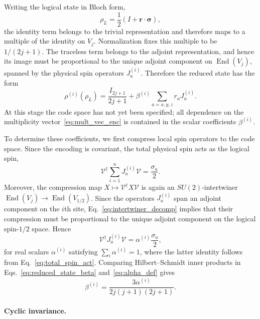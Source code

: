 \documentclass[10pt,twocolumn,superscriptaddress,aps,amsmath,amssymb,citeautoscript,floatfix,prx]{revtex4-2}
\theoremstyle{plain}
\theoremstyle{plain}
\theoremstyle{plain}
\theoremstyle{plain}
\theoremstyle{plain}
\theoremstyle{plain}
\theoremstyle{plain}
\theoremstyle{definition}
\theoremstyle{plain}
\begin{document}
Writing the logical state in Bloch form,
\[
    \rho_L=\frac12(I+\mathbf r\cdot\boldsymbol\sigma),
\]
the identity term belongs to the trivial representation and therefore maps to a multiple of the identity on $V_j$. 
Normalization fixes this multiple to be $1/(2j+1)$. The traceless term belongs to the adjoint representation, 
and hence its image must be proportional to the unique adjoint component on $\operatorname{End}(V_j)$, spanned by the physical spin operators $J_a^{(i)}$. 
Therefore the reduced state has the form
\begin{equation}\label{eq:reduced_state_beta}
    \rho^{(i)}(\rho_L)
    =
    \frac{I_{2j+1}}{2j+1}
    +
    \beta^{(i)}
    \sum_{a=x,y,z} r_a J_a^{(i)} .
\end{equation}
At this stage the code space has not yet been specified; all dependence on the multiplicity vector~\eqref{eq:mult_vec_enc} is contained in the scalar coefficients $\beta^{(i)}$.

To determine these coefficients, we first compress local spin operators to the code space. Since the encoding is covariant, the total physical spin acts as the logical spin,
\begin{equation}\label{eq:total_spin_act}
    \mathcal{V}^\dagger \sum_{i=1}^n J_a^{(i)} \mathcal{V}
    =
    \frac{\sigma_a}{2} .
\end{equation}
Moreover, the compression map $X\mapsto \mathcal{V}^\dagger X \mathcal{V}$ is again an $SU(2)$-intertwiner $\operatorname{End}(V_j)\rightarrow \operatorname{End}(V_{1/2})$. 
Since the operators $J_a^{(i)}$ span an adjoint component on the $i$th site, Eq.~\eqref{eq:intertwiner_decomp} implies that their compression must be proportional 
to the unique adjoint component on the logical spin-$1/2$ space. Hence
\begin{equation}\label{eq:alpha_def}
    \mathcal{V}^\dagger J_a^{(i)} \mathcal{V}
    =
    \alpha^{(i)}\frac{\sigma_a}{2},
\end{equation}
for real scalars $\alpha^{(i)}$ satisfying $\sum_i\alpha^{(i)}=1$, where the latter identity follows from Eq.~\eqref{eq:total_spin_act}. 
Comparing Hilbert--Schmidt inner products in Eqs.~\eqref{eq:reduced_state_beta} and~\eqref{eq:alpha_def} gives
\begin{equation}\label{eq:beta_through_alpha}
    \beta^{(i)}
    =
    \frac{3\alpha^{(i)}}{2j(j+1)(2j+1)} .
\end{equation}

\paragraph{Cyclic invariance.}
\end{document}
